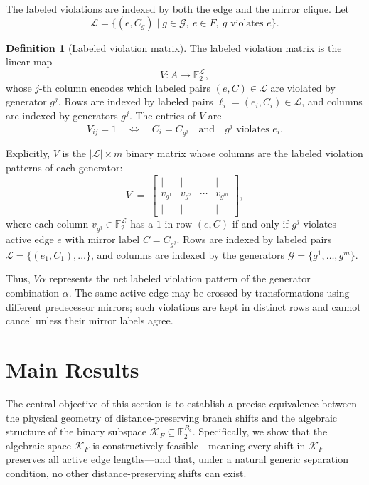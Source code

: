 \documentclass[11pt]{article}
\theoremstyle{plain}
\theoremstyle{definition}
\newtheorem{definition}{Definition}
\begin{document}
The labeled violations are indexed by both the edge and the mirror clique. Let
\[
\mathcal{L}
=
\{(e, C_g) \mid g \in \mathcal{G},\ e \in F,\ g \text{ violates } e\}.
\]
\begin{definition}[Labeled violation matrix]
\label{def:violation-matrix}
The labeled violation matrix is the linear map
\[
V: A \to \mathbb{F}_2^{\mathcal{L}},
\]
whose $j$-th column encodes which labeled pairs $(e,C)\in\mathcal{L}$ are violated by generator $g^j$.
Rows are indexed by labeled pairs $\ell_i=(e_i,C_i)\in\mathcal{L}$, and columns are indexed by generators $g^j$. The entries of $V$ are
\[
V_{ij} = 1
\quad\Longleftrightarrow\quad
C_i = C_{g^j} \quad\text{and}\quad g^j \text{ violates } e_i.
\]
\end{definition}

\noindent Explicitly, $V$ is the $\lvert\mathcal{L}\rvert\times m$ binary matrix whose columns are the labeled violation patterns of each generator:
\[
V \;=\;
\begin{bmatrix}
  \Big| & \Big| & & \Big| \\[4pt]
  v_{g^1} & v_{g^2} & \cdots & v_{g^m} \\[4pt]
  \Big| & \Big| & & \Big|
\end{bmatrix},
\]
where each column $v_{g^j}\in\mathbb{F}_2^{\mathcal{L}}$ has a $1$ in row $(e,C)$ if and only if $g^j$ violates active edge $e$ with mirror label $C=C_{g^j}$.
Rows are indexed by labeled pairs $\mathcal{L}=\{(e_1,C_1),\ldots\}$, and columns are indexed by the generators $\mathcal{G}=\{g^1,\ldots,g^m\}$.

Thus, $V\alpha$ represents the net labeled violation pattern of the generator combination $\alpha$. The same active edge may be crossed by transformations using different predecessor mirrors; such violations are kept in distinct rows and cannot cancel unless their mirror labels agree.

\section{Main Results}
\label{sec:results}

The central objective of this section is to establish a precise equivalence between the physical geometry of distance-preserving branch shifts and the algebraic structure of the binary subspace $\mathcal{K}_F \subseteq \mathbb{F}_2^{B_{\mathrm{c}}}$. Specifically, we show that the algebraic space $\mathcal{K}_F$ is constructively feasible—meaning every shift in $\mathcal{K}_F$ preserves all active edge lengths—and that, under a natural generic separation condition, no other distance-preserving shifts can exist.
\end{document}
